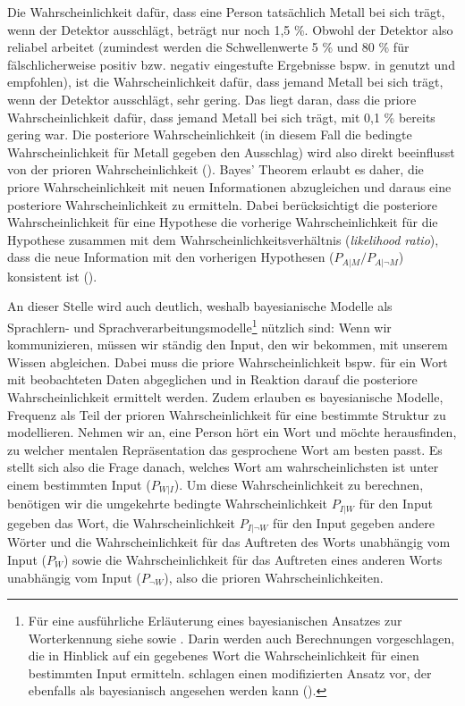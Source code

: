 Die Wahrscheinlichkeit dafür, dass eine Person tatsächlich Metall bei sich trägt, wenn der Detektor ausschlägt, beträgt nur noch 1,5 \%. Obwohl der Detektor also reliabel arbeitet (zumindest werden die Schwellenwerte 5 \% und 80 \% für fälschlicherweise positiv bzw. negativ eingestufte Ergebnisse bspw. in \cite[53--59]{Field.2012} genutzt und empfohlen), ist die Wahrscheinlichkeit dafür, dass jemand Metall bei sich trägt, wenn der Detektor ausschlägt, sehr gering. Das liegt daran, dass die priore Wahrscheinlichkeit dafür, dass jemand Metall bei sich trägt, mit 0,1 \% bereits gering war. Die posteriore Wahrscheinlichkeit (in diesem Fall die bedingte Wahrscheinlichkeit für Metall gegeben den Ausschlag) wird also direkt beeinflusst von der prioren Wahrscheinlichkeit (\cite[156--157]{Mitchel.1997}). Bayes' Theorem erlaubt es daher, die priore Wahrscheinlichkeit mit neuen Informationen abzugleichen und daraus eine posteriore Wahrscheinlichkeit zu ermitteln. Dabei berücksichtigt die posteriore Wahrscheinlichkeit für eine Hypothese die vorherige Wahrscheinlichkeit für die Hypothese zusammen mit dem Wahrscheinlichkeitsverhältnis (\textit{likelihood ratio}), dass die neue Information mit den vorherigen Hypothesen ($P_{A|M}/P_{A|\neg M}$) konsistent ist (\cite[330]{Norris.2006}).

An dieser Stelle wird auch deutlich, weshalb bayesianische Modelle als Sprach\-lern- und Sprachverarbeitungsmodelle\footnote{Für eine ausführliche Erläuterung eines bayesianischen Ansatzes zur Worterkennung siehe \textcite{Jurafsky.1996} sowie \textcite{Norris.2006}. Darin werden auch Berechnungen vorgeschlagen, die in Hinblick auf ein gegebenes Wort die Wahrscheinlichkeit für einen bestimmten Input ermitteln. \textcite{Baayen.2011} schlagen einen modifizierten Ansatz vor, der ebenfalls als bayesianisch angesehen werden kann (\cite[70]{Baayen.2011}).} nützlich sind: Wenn wir kommunizieren, müssen wir ständig den Input, den wir bekommen, mit unserem Wissen abgleichen. Dabei muss die priore Wahrscheinlichkeit bspw. für ein Wort mit beobachteten Daten abgeglichen und in Reaktion darauf die posteriore Wahrscheinlichkeit ermittelt werden. Zudem erlauben es bayesianische Modelle, Frequenz als Teil der prioren Wahrscheinlichkeit für eine bestimmte Struktur zu modellieren. Nehmen wir an, eine Person hört ein Wort und möchte herausfinden, zu welcher mentalen Repräsentation das gesprochene Wort am besten passt. Es stellt sich also die Frage danach, welches Wort am wahrscheinlichsten ist unter einem bestimmten Input ($P_{W|I}$). Um diese Wahrscheinlichkeit zu berechnen, benötigen wir die umgekehrte bedingte Wahrscheinlichkeit $P_{I|W}$ für den Input gegeben das Wort, die Wahrscheinlichkeit $P_{I|\neg W}$ für den Input gegeben andere Wörter und die Wahrscheinlichkeit für das Auftreten des Worts unabhängig vom Input ($P_{W}$) sowie die Wahrscheinlichkeit für das Auftreten eines anderen Worts unabhängig vom Input ($P_{\neg W}$), also die prioren Wahrscheinlichkeiten. 




